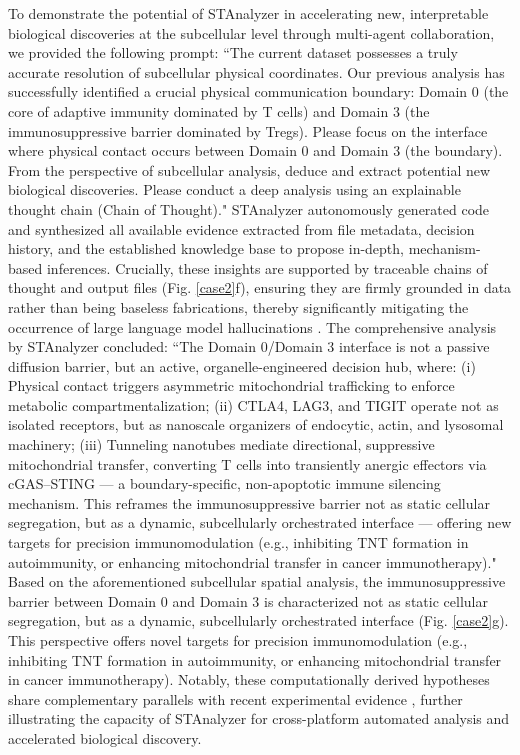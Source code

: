 \documentclass[a4,center,fleqn]{NAR}
\begin{document}
To demonstrate the potential of STAnalyzer in accelerating new, interpretable biological discoveries at the subcellular level through multi-agent collaboration, we provided the following prompt: ``The current dataset possesses a truly accurate resolution of subcellular physical coordinates. Our previous analysis has successfully identified a crucial physical communication boundary: Domain 0 (the core of adaptive immunity dominated by T cells) and Domain 3 (the immunosuppressive barrier dominated by Tregs). Please focus on the interface where physical contact occurs between Domain 0 and Domain 3 (the boundary). From the perspective of subcellular analysis, deduce and extract potential new biological discoveries. Please conduct a deep analysis using an explainable thought chain (Chain of Thought)." STAnalyzer autonomously generated code and synthesized all available evidence extracted from file metadata, decision history, and the established knowledge base to propose in-depth, mechanism-based inferences. Crucially, these insights are supported by traceable chains of thought and output files (Fig. \ref{case2}f), ensuring they are firmly grounded in data rather than being baseless fabrications, thereby significantly mitigating the occurrence of large language model hallucinations \cite{yao2022react}. The comprehensive analysis by STAnalyzer concluded: ``The Domain 0/Domain 3 interface is not a passive diffusion barrier, but an active, organelle-engineered decision hub, where: (i) Physical contact triggers asymmetric mitochondrial trafficking to enforce metabolic compartmentalization; (ii) CTLA4, LAG3, and TIGIT operate not as isolated receptors, but as nanoscale organizers of endocytic, actin, and lysosomal machinery; (iii) Tunneling nanotubes mediate directional, suppressive mitochondrial transfer, converting T cells into transiently anergic effectors via cGAS–STING — a boundary-specific, non-apoptotic immune silencing mechanism. This reframes the immunosuppressive barrier not as static cellular segregation, but as a dynamic, subcellularly orchestrated interface — offering new targets for precision immunomodulation (e.g., inhibiting TNT formation in autoimmunity, or enhancing mitochondrial transfer in cancer immunotherapy)." Based on the aforementioned subcellular spatial analysis, the immunosuppressive barrier between Domain 0 and Domain 3 is characterized not as static cellular segregation, but as a dynamic, subcellularly orchestrated interface (Fig. \ref{case2}g). This perspective offers novel targets for precision immunomodulation (e.g., inhibiting TNT formation in autoimmunity, or enhancing mitochondrial transfer in cancer immunotherapy). Notably, these computationally derived hypotheses share complementary parallels with recent experimental evidence \cite{baldwin2024intercellular,kwon2020cytosolic}, further illustrating the capacity of STAnalyzer for cross-platform automated analysis and accelerated biological discovery.
\end{document}
